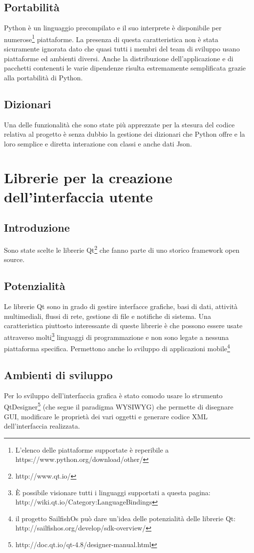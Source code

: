\documentclass[12pt]{scrartcl}
\begin{document}
\subsection{Portabilit\`a}
Python \`e un linguaggio precompilato e il suo interprete \`e disponibile per
numerose\footnote{L'elenco delle piattaforme supportate \`e reperibile a https://www.python.org/download/other/} piattaforme. 
La presenza di questa caratteristica non \`e stata sicuramente
ignorata dato che quasi tutti i membri del team di sviluppo usano piattaforme ed ambienti
diversi. Anche la distribuzione dell'applicazione e di pacchetti contenenti le 
varie dipendenze risulta estremamente semplificata grazie alla portabilit\`a di Python.


\subsection{Dizionari}
Una delle funzionalit\`a che sono state pi\`u apprezzate per la stesura del codice
relativa al progetto \`e senza dubbio la gestione dei dizionari che Python offre
e la loro semplice e diretta interazione con classi e anche dati Json.


\section{Librerie per la creazione dell'interfaccia utente}
\subsection{Introduzione}
Sono state scelte le librerie Qt\footnote{http://www.qt.io/} che fanno parte di uno storico
framework open source. 
\subsection{Potenzialit\`a}
Le librerie Qt sono in grado di gestire interfacce grafiche, basi di dati, 
attivit\`a multimediali, flussi di rete, gestione di file e notifiche di sistema.
Una caratteristica piuttosto interessante di queste librerie \`e che possono essere usate
attraverso molti\footnote{\`E possibile visionare tutti i linguaggi supportati a questa pagina: 
http://wiki.qt.io/Category:LanguageBindings}
linguaggi di programmazione e non sono legate a nessuna piattaforma specifica.
Permettono anche lo sviluppo di applicazioni mobile\footnote{
il progetto SailfishOs pu\`o dare un'idea delle potenzialit\`a delle librerie Qt:
http://sailfishos.org/develop/sdk-overview/}
\subsection{Ambienti di sviluppo}
Per lo sviluppo dell'interfaccia grafica \`e stato comodo usare lo strumento
QtDesigner\footnote{http://doc.qt.io/qt-4.8/designer-manual.html} (che segue il paradigma WYSIWYG) 
che permette di disegnare GUI, modificare le propriet\`a dei vari
oggetti e generare codice XML dell'interfaccia realizzata.
\end{document}
